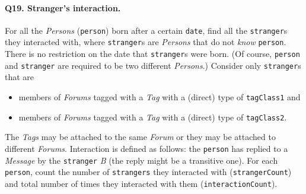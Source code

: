 \paragraph{\textbf{Q19}. Stranger's interaction.}
For all the \emph{Persons} (\texttt{person}) born after a certain
\texttt{date}, find all the \texttt{stranger}s they interacted with,
where \texttt{stranger}s are \emph{Persons} that do not \emph{know}
\texttt{person}. There is no restriction on the date that
\texttt{stranger}s were born. (Of course, \texttt{person} and
\texttt{stranger} are required to be two different \emph{Persons}.)
Consider only \texttt{stranger}s that are
\begin{itemize}
\tightlist
\item
  members of \emph{Forums} tagged with a \emph{Tag} with a (direct) type
  of \texttt{tagClass1} and
\item
  members of \emph{Forums} tagged with a \emph{Tag} with a (direct) type
  of \texttt{tagClass2}.
\end{itemize}
The \emph{Tags} may be attached to the same \emph{Forum} or they may be
attached to different \emph{Forums}.
Interaction is defined as follows: the \texttt{person} has replied to a
\emph{Message} by the \texttt{stranger} \emph{B} (the reply might be a
transitive one).
For each \texttt{person}, count the number of \texttt{strangers} they
interacted with (\texttt{strangerCount}) and total number of times they
interacted with them (\texttt{interactionCount}).
